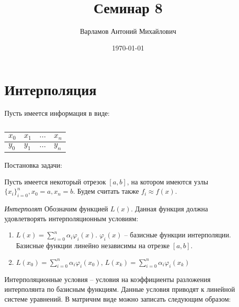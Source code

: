 \documentclass[10pt,a4paper]{article}
\title{Семинар 8}
\date{\today}
\author{Варламов Антоний Михайлович}
\begin{document}
	\maketitle
	
	\section{Интерполяция}
	
	Пусть имеется информация в виде:
	
	\begin{table}[h!]
	\centering
	\begin{tabular}{|l|l|l|l|}
	\hline
		$x_{0}$ & $x_{1}$ & $\ldots$ & $x_{n}$ \\ \hline
		$y_{0}$ & $y_{1}$ & $\ldots$ & $y_{n}$ \\ \hline
	\end{tabular}
	\caption{}
	\end{table}	
	
	Постановка задачи:
	
	Пусть имеется некоторый отрезок $\left[a, b\right]$, на котором 
	имеются узлы $\lbrace x_{i}\rbrace_{i = 0}^{n}, x_{0} = a, x_{n} = b$.
	Будем считать также $f_{i} \approx f\left(x\right)$.
	
	\textit{Интерполят} Обозначим функцией $L\left(x\right)$. Данная функция 
	должна удовлетворять интерполяционным условиям:
	
	\begin{enumerate}
		\item $L\left(x\right) = \sum\limits_{i = 0}^{n} \alpha_{i}
		\varphi_{i}\left(x\right)$. $\varphi_{i}\left(x\right)$ --
		базисные функции интерполяции. Базисные функции линейно независимы
		на отрезке $\left[a, b\right]$.
		\item $L\left(x_{0}\right) = \sum\limits_{i = 0}^{n} \alpha_{i}
		\varphi_{i}\left(x_{0}\right)$,
		$L\left(x_{k}\right) = \sum\limits_{i = 0}^{n} \alpha_{i}
		\varphi_{i}\left(x_{k}\right)$
	\end{enumerate}
	
	Интерполяционные условия -- условия на коэффициенты разложения интерполянта 
	по базисным функциям. Данные условия приводят к линейной системе уравнений.
	В матричнм виде можно записать следующим образом:
	
\end{document}
